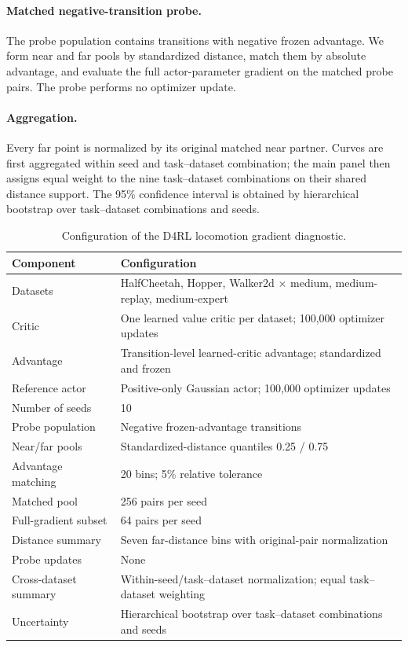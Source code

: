 \documentclass{article}
\theoremstyle{plain}
\theoremstyle{definition}
\theoremstyle{remark}
\begin{document}
\paragraph{Matched negative-transition probe.}
The probe population contains transitions with negative frozen advantage. We
form near and far pools by standardized distance, match them by absolute
advantage, and evaluate the full actor-parameter gradient on the matched probe
pairs. The probe performs no optimizer update.

\paragraph{Aggregation.}
Every far point is normalized by its original matched near partner. Curves are
first aggregated within seed and task--dataset combination; the main panel then
assigns equal weight to the nine task--dataset combinations on their shared
distance support. The 95\% confidence interval is obtained by hierarchical
bootstrap over task--dataset combinations and seeds.

\begin{table}[t]
\centering
\caption{Configuration of the D4RL locomotion gradient diagnostic.}
\label{tab:app_d4rl_gradient_protocol}
\small
\setlength{\tabcolsep}{5pt}
\begin{tabular}{ll}
\toprule
Component & Configuration \\
\midrule
Datasets & HalfCheetah, Hopper, Walker2d $\times$ medium, medium-replay, medium-expert \\
Critic & One learned value critic per dataset; 100,000 optimizer updates \\
Advantage & Transition-level learned-critic advantage; standardized and frozen \\
Reference actor & Positive-only Gaussian actor; 100,000 optimizer updates \\
Number of seeds & 10 \\
Probe population & Negative frozen-advantage transitions \\
Near/far pools & Standardized-distance quantiles 0.25 / 0.75 \\
Advantage matching & 20 bins; 5\% relative tolerance \\
Matched pool & 256 pairs per seed \\
Full-gradient subset & 64 pairs per seed \\
Distance summary & Seven far-distance bins with original-pair normalization \\
Probe updates & None \\
Cross-dataset summary & Within-seed/task--dataset normalization; equal task--dataset weighting \\
Uncertainty & Hierarchical bootstrap over task--dataset combinations and seeds \\
\bottomrule
\end{tabular}
\end{table}
\end{document}
